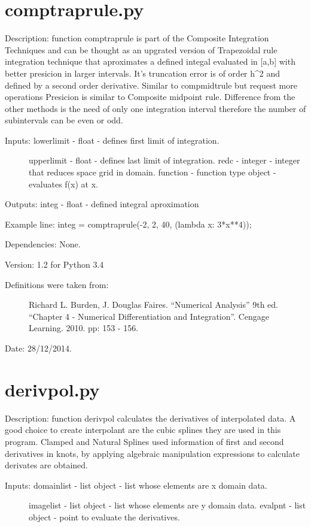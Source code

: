 \documentclass[letterpaper,10pt,oneside]{sphinxmanual}
\theoremstyle{plain}%
\theoremstyle{definition}%
\theoremstyle{remark}%
\begin{document}
\section{comptraprule.py}
\label{code:module-comptraprule}\label{code:comptraprule-py}
Description: function comptraprule is part of the Composite Integration
Techniques and can be thought as an upgrated version of Trapezoidal rule
integration technique that aproximates a defined integal evaluated in {[}a,b{]}
with better presicion in larger intervals. It's truncation error is of order
h\textasciicircum{}2 and defined by a second order derivative. Similar to compmidtrule but
request more operations Presicion is similar to Composite midpoint rule.
Difference from the other methods is the need of only one integration interval
therefore the number of subintervals can be even or odd.
\begin{description}
\item[{Inputs: lowerlimit - float - defines first limit of integration.}] \leavevmode
upperlimit - float - defines last limit of integration.
redc - integer - integer that reduces space grid in domain.
function - function type object - evaluates f(x) at x.

\end{description}

Outputs: integ - float - defined integral aproximation

Example line: integ = comptraprule(-2, 2, 40, (lambda x: 3*x**4));

Dependencies: None.

Version: 1.2 for Python 3.4
\begin{description}
\item[{Definitions were taken from:}] \leavevmode
Richard L. Burden, J. Douglas Faires. ``Numerical Analysis'' 9th ed.
``Chapter 4 - Numerical Differentiation and Integration''. 
Cengage Learning. 2010. pp: 153 - 156.

\end{description}




Date: 28/12/2014.


\section{derivpol.py}
\label{code:module-derivpol}\label{code:derivpol-py}
Description: function derivpol calculates the derivatives of interpolated
data. A good choice to create interpolant are the cubic splines they are
used in this program. Clamped and Natural Splines used information of
first and second derivatives in knots, by applying algebraic manipulation
expressions to calculate derivates are obtained.
\begin{description}
\item[{Inputs: domainlist - list object - list whose elements are x domain data.}] \leavevmode
imagelist - list object - list whose elements are y domain data.
evalpnt - list object - point to evaluate the derivatives.

\end{description}
\end{document}
